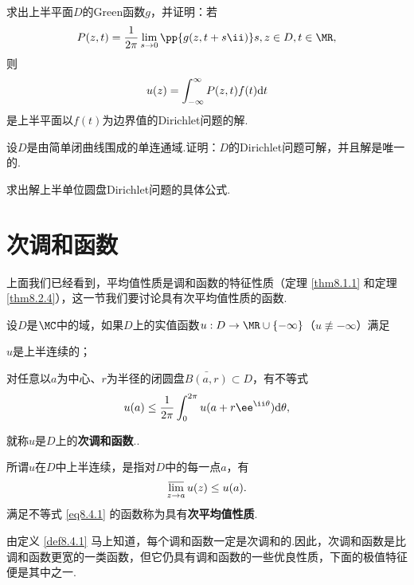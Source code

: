 \begin{xiti}
\item 求出上半平面$D$的Green函数$g$，并证明：若
\[P(z,t)=\frac1{2\pi}\lim_{s\to0}\pp{g(z,t+s\ii)}s,z\in D,t\in\MR,\]
则
\[u(z)=\int_{-\infty}^\infty P(z,t)f(t)\textrm dt\]
是上半平面以$f(t)$为边界值的Dirichlet问题的解.
\item 设$D$是由简单闭曲线围成的单连通域.证明：$D$的Dirichlet问题可解，并且解是唯一的.
\item 求出解上半单位圆盘Dirichlet问题的具体公式.
\end{xiti}

\section{次调和函数\label{sec8.4}}
上面我们已经看到，平均值性质是调和函数的特征性质（定理 \ref{thm8.1.1} 和定理 \ref{thm8.2.4}），这一节我们要讨论具有次平均值性质的函数.
\begin{definition}\label{def8.4.1}
设$D$是$\MC$中的域，如果$D$上的实值函数$u:D\to\MR\cup\{-\infty\}$（$u\not\equiv-\infty$）满足
\begin{eenum}
  \item $u$是上半连续的；
  \item 对任意以$a$为中心、$r$为半径的闭圆盘$\bar{B(a,r)}\subset D$，有不等式
  \begin{equation}\label{eq8.4.1}
    u(a)\le\frac1{2\pi}\int_0^{2\pi}u(a+r\ee^{\ii\theta})\textrm d\theta,
  \end{equation}
\end{eenum}
就称$u$是$D$上的\textbf{次调和函数}..
\end{definition}

所谓$u$在$D$中上半连续，是指对$D$中的每一点$a$，有
\[\varlimsup_{z\to a}u(z)\le u(a).\]
满足不等式 \eqref{eq8.4.1} 的函数称为具有\textbf{次平均值性质}.

由定义 \ref{def8.4.1} 马上知道，每个调和函数一定是次调和的.因此，次调和函数是比调和函数更宽的一类函数，但它仍具有调和函数的一些优良性质，下面的极值特征便是其中之一.

